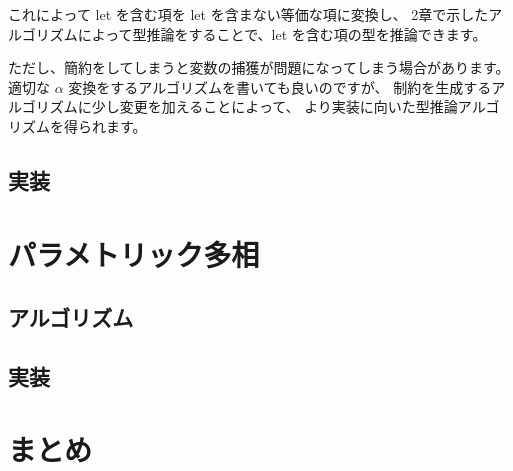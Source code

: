 これによって let を含む項を let を含まない等価な項に変換し、
2章で示したアルゴリズムによって型推論をすることで、let を含む項の型を推論できます。

ただし、簡約をしてしまうと変数の捕獲が問題になってしまう場合があります。
適切な $\alpha$ 変換をするアルゴリズムを書いても良いのですが、
制約を生成するアルゴリズムに少し変更を加えることによって、
より実装に向いた型推論アルゴリズムを得られます。



\subsection{実装}



\section{パラメトリック多相}



\subsection{アルゴリズム}



\subsection{実装}



\section{まとめ}



